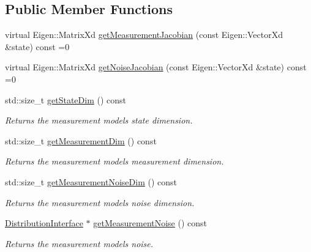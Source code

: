\subsection*{Public Member Functions}
\begin{DoxyCompactItemize}
\item 
virtual Eigen\+::\+Matrix\+Xd \hyperlink{classrefill_1_1LinearizedMeasurementModel_a1a9fbbf32f4e71b666ee6609cdc99da7}{get\+Measurement\+Jacobian} (const Eigen\+::\+Vector\+Xd \&state) const =0
\item 
virtual Eigen\+::\+Matrix\+Xd \hyperlink{classrefill_1_1LinearizedMeasurementModel_a3573eb964dd7bff58b05af85fa46a8a0}{get\+Noise\+Jacobian} (const Eigen\+::\+Vector\+Xd \&state) const =0
\item 
std\+::size\+\_\+t \hyperlink{classrefill_1_1LinearizedMeasurementModel_a370fd9906f5f718e5fdb2f4dfa1a59bf}{get\+State\+Dim} () const 
\begin{DoxyCompactList}\small\item\em Returns the measurement models state dimension. \end{DoxyCompactList}\item 
std\+::size\+\_\+t \hyperlink{classrefill_1_1LinearizedMeasurementModel_aed3deac071dbf35901303ef42ba2163d}{get\+Measurement\+Dim} () const 
\begin{DoxyCompactList}\small\item\em Returns the measurement models measurement dimension. \end{DoxyCompactList}\item 
std\+::size\+\_\+t \hyperlink{classrefill_1_1LinearizedMeasurementModel_ad6b71dfa7fa9a77544ed76f83781af6e}{get\+Measurement\+Noise\+Dim} () const 
\begin{DoxyCompactList}\small\item\em Returns the measurement models noise dimension. \end{DoxyCompactList}\item 
\hyperlink{classrefill_1_1DistributionInterface}{Distribution\+Interface} $\ast$ \hyperlink{classrefill_1_1LinearizedMeasurementModel_a320cf84380a5a4f03a6cacee8ef74bf6}{get\+Measurement\+Noise} () const 
\begin{DoxyCompactList}\small\item\em Returns the measurement models noise. \end{DoxyCompactList}\end{DoxyCompactItemize}
